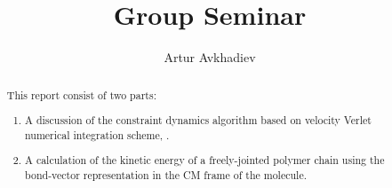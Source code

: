 \documentclass[%
    reprint,
    superscriptaddress,
    longbibliography,
    bibnotes,
     amsmath,amssymb,
     aip,
     jcp,                                       %
    ]{revtex4-1}
\newcommand{\seminardate}{\DTMdisplaydate{2017}{7}{25}{-1}}
\numberwithin{equation}{section}                %
\begin{document}
\lstset{language=Python}
\title{Group Seminar}
\author{Artur Avkhadiev}
\date{\seminardate}
\begin{abstract}
  This report consist of two parts:
  \begin{enumerate}
      \item A discussion of the constraint dynamics algorithm based on velocity Verlet numerical integration scheme, \rattle.
      \item A calculation of the kinetic energy of a freely-jointed polymer chain using the bond-vector representation in the CM frame of the molecule.
    \end{enumerate}
\end{abstract}
\maketitle
\tableofcontents						 %


\nocite{*}


\onecolumngrid

\end{document}
